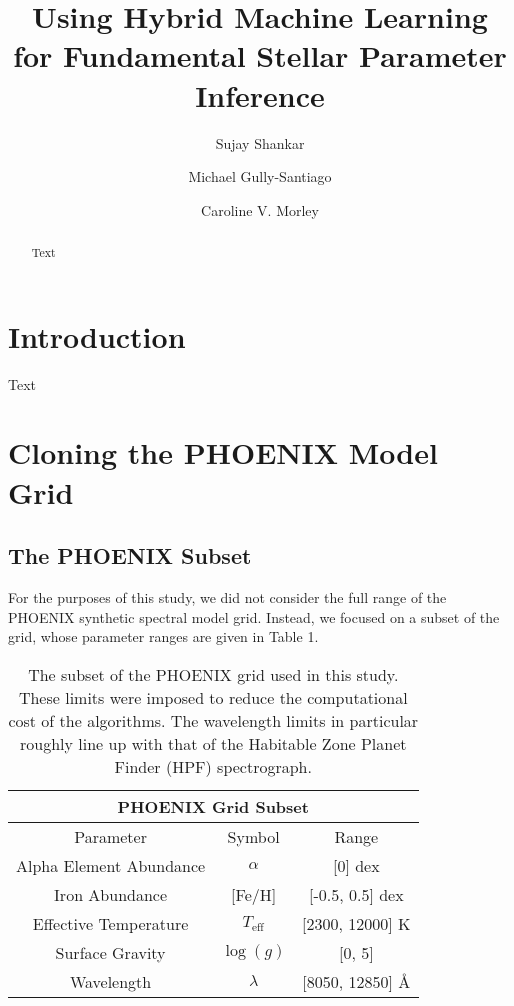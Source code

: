 \documentclass[twocolumn]{aastex631}
\begin{document}
\title{Using Hybrid Machine Learning for Fundamental Stellar Parameter Inference}
\author[0000-0002-2290-6810]{Sujay Shankar}
\author[0000-0002-4020-3457]{Michael Gully-Santiago}
\author[0000-0002-4404-0456]{Caroline V. Morley}

\begin{abstract}
    Text
\end{abstract}

\section{Introduction}
Text

\section{Cloning the PHOENIX Model Grid}
\subsection{The PHOENIX Subset}
For the purposes of this study, we did not consider the full range of the
PHOENIX synthetic spectral model grid. Instead, we focused on a subset of 
the grid, whose parameter ranges are given in Table 1.

\begin{table}[h]
    \hspace*{-1.1cm}\begin{tabular}{|c|c|c|}
        \hline
        \multicolumn{3}{|c|}{\textbf{PHOENIX Grid Subset}}\\
        \hline\hline
        Parameter & Symbol & Range\\
        \hline
        Alpha Element Abundance & $\alpha$ & [0] dex\\
        Iron Abundance & [Fe/H] & [-0.5, 0.5] dex\\
        Effective Temperature & $T_{\mathrm{eff}}$ & [2300, 12000] K\\
        Surface Gravity & $\log(g)$ & [0, 5]\\
        Wavelength & $\lambda$ & [8050, 12850] \AA\\
        \hline
    \end{tabular}
    \caption{The subset of the PHOENIX grid used in this study. These limits 
    were imposed to reduce the computational cost of the algorithms. The 
    wavelength limits in particular roughly line up with that of the 
    Habitable Zone Planet Finder (HPF) spectrograph.}
\end{table}
\end{document}
